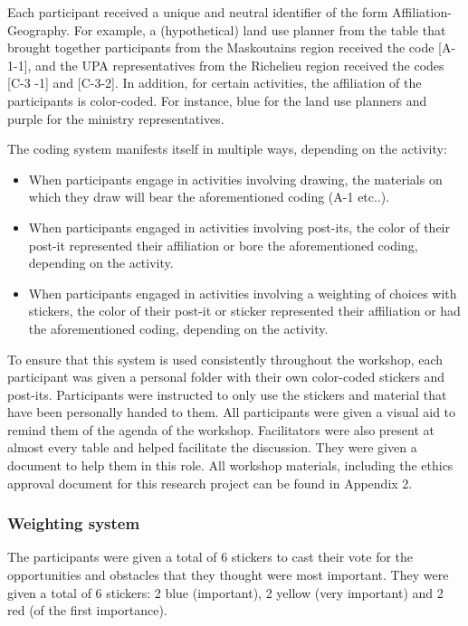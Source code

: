 Each participant received a unique and neutral identifier of the form Affiliation-Geography. For example, a (hypothetical) land use planner from the table that brought together participants from the Maskoutains region received the code [A-1-1], and the UPA representatives from the Richelieu region received the codes [C-3 -1] and [C-3-2]. In addition, for certain activities, the affiliation of the participants is color-coded. For instance, blue for the land use planners and purple for the ministry representatives.

The coding system manifests itself in multiple ways, depending on the activity:
\begin{itemize}
\item When participants engage in activities involving drawing, the materials on which they draw will bear the aforementioned coding (A-1 etc..).
\item When participants engaged in activities involving post-its, the color of their post-it represented their affiliation or bore the aforementioned coding, depending on the activity.
\item When participants engaged in activities involving a weighting of choices with stickers, the color of their post-it or sticker represented their affiliation or had the aforementioned coding, depending on the activity.
\end{itemize}

To ensure that this system is used consistently throughout the workshop, each participant was given a personal folder with their own color-coded stickers and post-its. Participants were instructed to only use the stickers and material that have been personally handed to them. All participants were given a visual aid to remind them of the agenda of the workshop. Facilitators were also present at almost every table and helped facilitate the discussion. They were given a document to help them in this role. All workshop materials, including the ethics approval document for this research project can be found in Appendix 2.\\

\subsubsection*{Weighting system}

 The participants were given a total of 6 stickers to cast their vote for the opportunities and obstacles that they thought were most important. They were given a total of 6 stickers: 2 blue (important), 2 yellow (very important) and 2 red (of the first importance).\\

